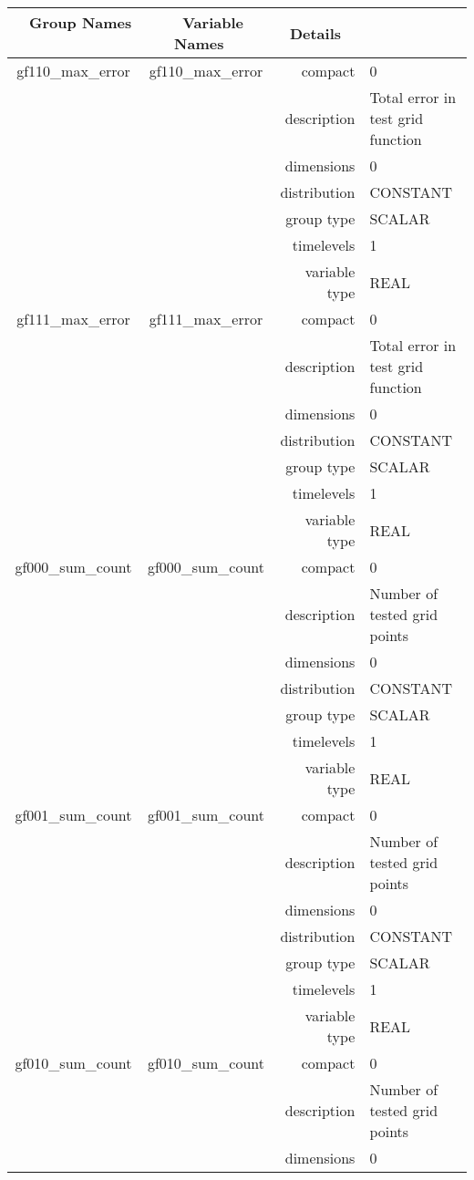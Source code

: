 \begin{tabular*}{150mm}{|c|c@{\extracolsep{\fill}}|rl|} \hline 
~ {\bf Group Names} ~ & ~ {\bf Variable Names} ~  &{\bf Details} ~ & ~ \\ 
\hline 
gf110\_max\_error & gf110\_max\_error & compact & 0 \\ 
 &  & description & Total error in test grid function \\ 
 &  & dimensions & 0 \\ 
 &  & distribution & CONSTANT \\ 
 &  & group type & SCALAR \\ 
 &  & timelevels & 1 \\ 
 &  & variable type & REAL \\ 
\hline 
gf111\_max\_error & gf111\_max\_error & compact & 0 \\ 
 &  & description & Total error in test grid function \\ 
 &  & dimensions & 0 \\ 
 &  & distribution & CONSTANT \\ 
 &  & group type & SCALAR \\ 
 &  & timelevels & 1 \\ 
 &  & variable type & REAL \\ 
\hline 
gf000\_sum\_count & gf000\_sum\_count & compact & 0 \\ 
 &  & description & Number of tested grid points \\ 
 &  & dimensions & 0 \\ 
 &  & distribution & CONSTANT \\ 
 &  & group type & SCALAR \\ 
 &  & timelevels & 1 \\ 
 &  & variable type & REAL \\ 
\hline 
gf001\_sum\_count & gf001\_sum\_count & compact & 0 \\ 
 &  & description & Number of tested grid points \\ 
 &  & dimensions & 0 \\ 
 &  & distribution & CONSTANT \\ 
 &  & group type & SCALAR \\ 
 &  & timelevels & 1 \\ 
 &  & variable type & REAL \\ 
\hline 
gf010\_sum\_count & gf010\_sum\_count & compact & 0 \\ 
 &  & description & Number of tested grid points \\ 
 &  & dimensions & 0 \\ 

\end{tabular*}
